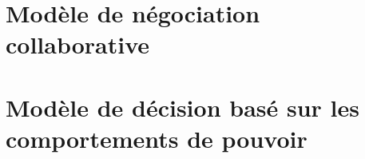 \documentclass[a4paper, 11pt]{book}
\begin{document}
	

	\chapter{Modèle de négociation collaborative}
		\minitoc
		
	
	
	\chapter{Modèle de décision basé sur les comportements de pouvoir}
	\minitoc
	
	
	\label{chap:dec}
	
	
\end{document}

